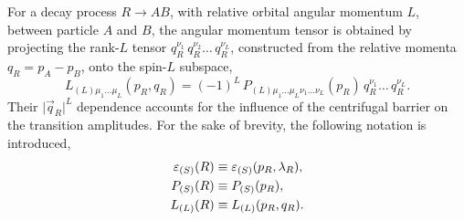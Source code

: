 For a decay process $R \to A B$, with relative orbital angular momentum $L$, between particle $A$ and $B$,
the angular momentum tensor is obtained by 
projecting 
the rank-$L$ tensor $q_R^{\nu_{1}}   \,  q_R^{\nu_{2}}  \dots  \,  q_R^{\nu_{L}} $, constructed from the relative momenta
$q_{R} = p_{A} - p_{B}$,
onto the spin-$L$ subspace,
\begin{equation}
	L_{(L)\mu_{1}  \dots \mu_{L}}(p_{R},q_{R}) = (-1)^{L}  \, P_{(L)\mu_{1}  \dots \mu_{L} \nu_{1}  \dots \nu_{L}}(p_R)  \, 
	 q_R^{\nu_{1}}     \dots  \,  q_R^{\nu_{L}}  .
\end{equation}
Their $\vert \vec q_{R} \vert^{L} $ dependence accounts for the influence of the centrifugal barrier on the transition amplitudes.
For the sake of brevity, the following 
 notation is introduced,
\begin{align}
\nonumber
{\ensuremath{\varepsilon}}_{(S)}(R) & \equiv {\ensuremath{\varepsilon}}_{(S)}(p_{R},\lambda_{R}) , \\ \nonumber
P_{(S)}(R) & \equiv P_{(S)}(p_{R}), \\
L_{(L)}(R) & \equiv L_{(L)}(p_{R},q_{R})  .
\end{align}


